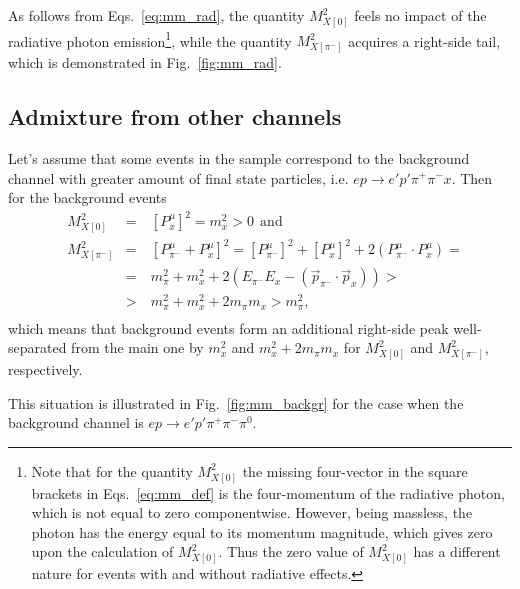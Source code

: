 \vspace{-1.5em}
As follows from Eqs.~\eqref{eq:mm_rad}, the quantity $M_{X[0]}^{2}$ feels no impact of the radiative photon emission\footnote[3]{Note that for the quantity $M_{X[0]}^{2}$ the missing four-vector in the square brackets in Eqs.~\eqref{eq:mm_def} is the four-momentum of the radiative photon, which is not equal to zero componentwise. However, being massless, the photon has the energy equal to its momentum magnitude, which gives zero upon the calculation of $M_{X[0]}^{2}$. Thus the zero value of $M_{X[0]}^{2}$ has a different nature for events with and without radiative effects.}, while the quantity $M_{X[\pi^{-}]}^{2}$ acquires a right-side tail, which is demonstrated in Fig.~\ref{fig:mm_rad}.


\vspace{-0.75em}
\subsection*{Admixture from other channels}
\vspace{-0.5em}
Let's assume that some events in the sample correspond to the background channel with greater amount of final state particles, i.e. $ep\rightarrow e'p'\pi^{+}\pi^{-}x$. Then for the background events\vspace{-0.5em}
\begin{equation}
\begin{aligned}
&M_{X[0]}^{2}&=&~[P^{\mu}_{x}]^{2} = m_{x}^{2} >0~~\textrm{and}\\[8pt]
&M_{X[\pi^{-}]}^{2}&=&~[P_{\pi^{-}}^{\mu}+P^{\mu}_{x}]^{2}=[P^{\mu}_{\pi^{-}}]^{2} +[P^{\mu}_{x}]^{2}+2(P^{\mu}_{\pi^{-}}\cdot P^{\mu}_{x} ) =\\
&&=&~m_{\pi}^{2} + m_{x}^{2} +2(E_{\pi^{-}}E_{x} - (\overrightarrow{p}_{\pi^{-}}\cdot \overrightarrow{p}_{x})) > \\
&&>&~m_{\pi}^{2} + m_{x}^{2}+2m_{\pi}m_{x} > m_{\pi}^{2},\\[-7pt]
\end{aligned}\label{eq:mm_other_ch}
\end{equation}
which means that background events form an additional right-side peak well-separated from the main one by $m_{x}^{2}$ and $m_{x}^{2}+2m_{\pi}m_{x}$ for $M_{X[0]}^{2}$ and $M_{X[\pi^{-}]}^{2}$, respectively.

This situation is illustrated in Fig.~\ref{fig:mm_backgr} for the case when the background channel is $ep\rightarrow e'p'\pi^{+}\pi^{-}\pi^{0}$.

